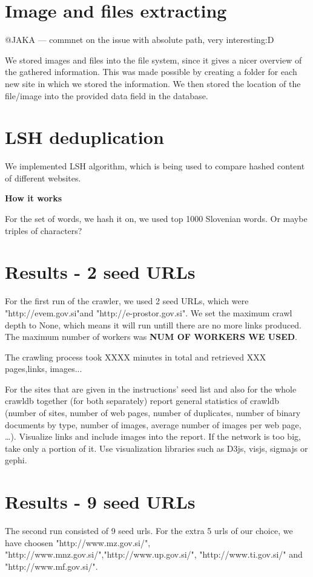 \documentclass[9pt]{IEEEtran}
\begin{document}
\section{Image and files extracting}
@JAKA --- commnet on the issue with absolute path, very interesting:D

We stored images and files into the file system, since it gives a nicer overview of the gathered information. This was made possible by creating a folder for each new site in which we stored the information. We then stored the location of the file/image into the provided data field in the database.




\section{LSH deduplication}
We implemented LSH algorithm, which is being used to compare hashed content of different websites. 

\textbf{How it works}

For the set of words, we hash it on, we used top 1000 Slovenian words. Or maybe triples of characters?


\section{Results - 2 seed URLs}
For the first run of the crawler, we used 2 seed URLs, which were "http://evem.gov.si"and "http://e-prostor.gov.si". We set the maximum crawl depth to None, which means it will run untill there are no more links produced. The maximum number of workers was \textbf{NUM OF WORKERS WE USED}.

The crawling process took XXXX minutes in total and retrieved XXX pages,links, images...

For the sites that are given in the instructions’ seed list and also for the whole crawldb together (for both separately) report general statistics of crawldb (number of sites, number of web pages, number of duplicates, number of binary documents by type, number of images, average number of images per web page, …). Visualize links and include images into the report. If the network is too big, take only a portion of it. Use visualization libraries such as D3js, visjs, sigmajs or gephi.

\section{Results - 9 seed URLs}
The second run consisted of 9 seed urls. For the extra 5 urls of our choice, we have choosen "http://www.mz.gov.si/", "http://www.mnz.gov.si/","http://www.up.gov.si/", "http://www.ti.gov.si/" and "http://www.mf.gov.si/". 
\end{document}
